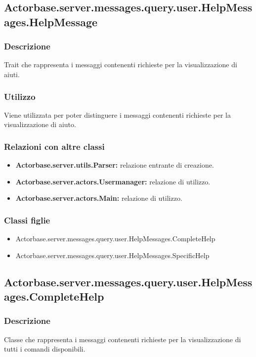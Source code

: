 \documentclass[a4paper]{article}
\begin{document}
		\subsection{Actorbase.server.messages.query.user.HelpMessages.HelpMessage}
			\subsubsection{Descrizione}
				Trait che rappresenta i messaggi contenenti richieste per la visualizzazione di aiuti.
				
			\subsubsection{Utilizzo}
				Viene utilizzata per poter distinguere i messaggi contenenti richieste per la visualizzazione di aiuto.
			\subsubsection{Relazioni con altre classi}
				\begin{itemize}
					\item \textbf{Actorbase.server.utils.Parser:} relazione entrante di creazione.
					\item \textbf{Actorbase.server.actors.Usermanager:} relazione di utilizzo.
					\item \textbf{Actorbase.server.actors.Main:} relazione di utilizzo.
				\end{itemize}
			\subsubsection{Classi figlie}
				\begin{itemize}
					\item Actorbase.server.messages.query.user.HelpMessages.CompleteHelp
					\item Actorbase.server.messages.query.user.HelpMessages.SpecificHelp
				\end{itemize}
		
		\subsection{Actorbase.server.messages.query.user.HelpMessages.CompleteHelp}
			\subsubsection{Descrizione}
				Classe che rappresenta i messaggi contenenti richieste per la visualizzazione di tutti i comandi disponibili.
				
\end{document}
